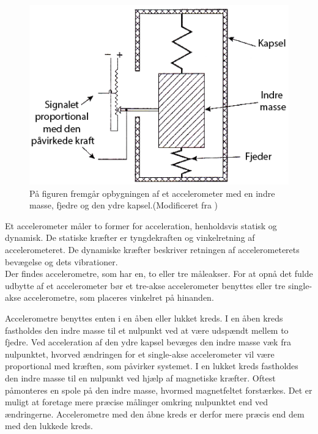 \begin{figure}[H]
	\centering
	\includegraphics[scale=0.5]{figures/bProblemloesning/accelerometer_basic.png}
	\caption{På figuren fremgår opbygningen af et accelerometer med en indre masse, fjedre og den ydre kapsel.(Modificeret fra \citep{TittertonWeston2004})}
	\label{acc_simpelt}
\end{figure}

Et accelerometer måler to former for acceleration, henholdsvis statisk og dynamisk. De statiske kræfter er tyngdekraften og vinkelretning af accelerometeret. De dynamiske kræfter beskriver retningen af accelerometerets bevægelse og dets vibrationer. \citep{Sparkfun,Engineering, Goodrich2013} \\
Der findes accelerometre, som har en, to eller tre måleakser. For at opnå det fulde udbytte af et accelerometer bør et tre-akse accelerometer benyttes eller tre single-akse accelerometre, som placeres vinkelret på hinanden.\citep{TittertonWeston2004} 

Accelerometre benyttes enten i en åben eller lukket kreds. I en åben kreds fastholdes den indre masse til et nulpunkt ved at være udspændt mellem to fjedre. Ved acceleration af den ydre kapsel bevæges den indre masse væk fra nulpunktet, hvorved ændringen for et single-akse accelerometer vil være proportional med kræften, som påvirker systemet. \newline
I en lukket kreds fastholdes den indre masse til en nulpunkt ved hjælp af magnetiske kræfter. Oftest påmonteres en spole på den indre masse, hvormed magnetfeltet forstærkes. Det er muligt at foretage mere præcise målinger omkring nulpunktet end ved ændringerne. Accelerometre med den åbne kreds er derfor mere præcis end dem med den lukkede kreds. 


